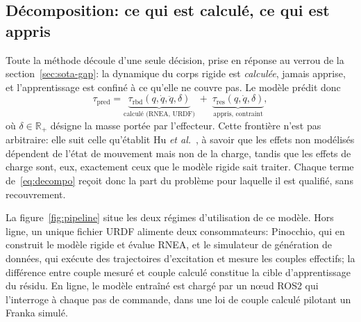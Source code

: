 \documentclass[a4paper, oneside]{article}
\newcommand{\q}{\ensuremath{q}}
\newcommand{\qd}{\ensuremath{\dot{q}}}
\newcommand{\qdd}{\ensuremath{\ddot{q}}}
\newcommand{\taurbd}{\ensuremath{\tau_{\mathrm{rbd}}}}
\newcommand{\taures}{\ensuremath{\tau_{\mathrm{res}}}}
\newcommand{\taupred}{\ensuremath{\tau_{\mathrm{pred}}}}
\newcommand{\Rset}{\ensuremath{\mathbb{R}}}
\begin{document}
\subsection{Décomposition: ce qui est calculé, ce qui est appris}
\label{sec:overview}

Toute la méthode découle d'une seule décision, prise en réponse au verrou de la
section~\ref{sec:sota-gap}: la dynamique du corps rigide est \emph{calculée},
jamais apprise, et l'apprentissage est confiné à ce qu'elle ne couvre pas. Le
modèle prédit donc
%
\begin{equation}
    \taupred = \underbrace{\taurbd(\q,\qd,\qdd,\delta)}_{\text{calculé
    (RNEA, URDF)}}
    \;+\;
    \underbrace{\taures(\q,\qd,\delta)}_{\text{appris, contraint}} ,
    \label{eq:decompo}
\end{equation}
%
où $\delta \in \Rset_{+}$ désigne la masse portée par l'effecteur. Cette
frontière n'est pas arbitraire: elle suit celle qu'établit
Hu \emph{et al.}~\cite{hu2026}, à savoir que les effets non modélisés dépendent
de l'état de mouvement mais non de la charge, tandis que les effets de charge
sont, eux, exactement ceux que le modèle rigide sait traiter. Chaque terme
de~\eqref{eq:decompo} reçoit donc la part du problème pour laquelle il est
qualifié, sans recouvrement.

La figure~\ref{fig:pipeline} situe les deux régimes d'utilisation de ce modèle.
Hors ligne, un unique fichier URDF alimente deux consommateurs: Pinocchio, qui
en construit le modèle rigide et évalue RNEA, et le simulateur de génération de
données, qui exécute des trajectoires d'excitation et mesure les couples
effectifs; la différence entre couple mesuré et couple calculé constitue la
cible d'apprentissage du résidu. En ligne, le modèle entraîné est chargé par un
n\oe ud ROS2 qui l'interroge à chaque pas de commande, dans une loi de couple
calculé pilotant un Franka simulé.
\end{document}
